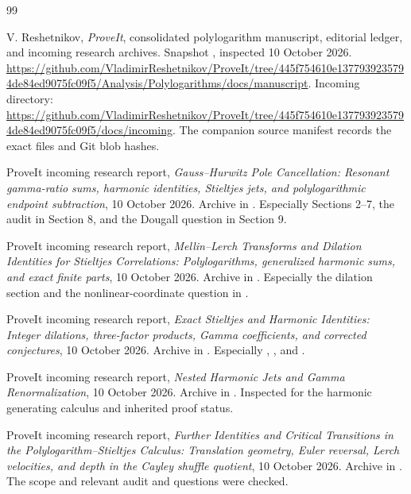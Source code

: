 \begin{thebibliography}{99}

V. Reshetnikov, \emph{ProveIt}, consolidated polylogarithm manuscript,
editorial ledger, and incoming research archives. Snapshot
\pin, inspected 10 October 2026.
\url{https://github.com/VladimirReshetnikov/ProveIt/tree/445f754610e1377939235794de84ed9075fc09f5/Analysis/Polylogarithms/docs/manuscript}.
Incoming directory:
\url{https://github.com/VladimirReshetnikov/ProveIt/tree/445f754610e1377939235794de84ed9075fc09f5/docs/incoming}.
The companion source manifest records the exact files and Git blob hashes.

ProveIt incoming research report,
\emph{Gauss--Hurwitz Pole Cancellation: Resonant gamma-ratio sums,
harmonic identities, Stieltjes jets, and polylogarithmic endpoint
subtraction}, 10 October 2026.
Archive  in \cite{repo}.
Especially Sections 2--7, the audit in Section 8, and the Dougall
question in Section 9.

ProveIt incoming research report,
\emph{Mellin--Lerch Transforms and Dilation Identities for Stieltjes
Correlations: Polylogarithms, generalized harmonic sums, and exact
finite parts}, 10 October 2026.
Archive  in \cite{repo}.
Especially the dilation section and the nonlinear-coordinate question
in .

ProveIt incoming research report,
\emph{Exact Stieltjes and Harmonic Identities: Integer dilations,
three-factor products, Gamma coefficients, and corrected conjectures},
10 October 2026.
Archive 
in \cite{repo}. Especially ,
, and .

ProveIt incoming research report,
\emph{Nested Harmonic Jets and Gamma Renormalization},
10 October 2026.
Archive  in \cite{repo}.
Inspected for the harmonic generating calculus and inherited proof status.

ProveIt incoming research report,
\emph{Further Identities and Critical Transitions in the
Polylogarithm--Stieltjes Calculus: Translation geometry, Euler reversal,
Lerch velocities, and depth in the Cayley shuffle quotient},
10 October 2026.
Archive 
in \cite{repo}. The scope and relevant audit and questions were checked.


\end{thebibliography}
